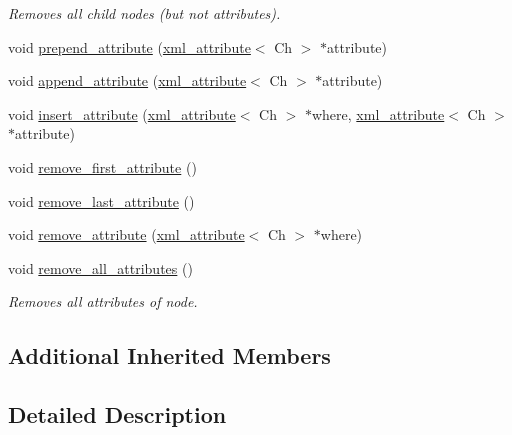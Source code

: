 \begin{DoxyCompactItemize}
\begin{DoxyCompactList}\small\item\em Removes all child nodes (but not attributes). \end{DoxyCompactList}\item 
void \hyperlink{classrapidxml_1_1xml__node_a8b62ee76489faf8e2d1210869d547684}{prepend\-\_\-attribute} (\hyperlink{classrapidxml_1_1xml__attribute}{xml\-\_\-attribute}$<$ Ch $>$ $\ast$attribute)
\item 
void \hyperlink{classrapidxml_1_1xml__node_a33ce3386f8c42dd4db658b75cbb6e6c4}{append\-\_\-attribute} (\hyperlink{classrapidxml_1_1xml__attribute}{xml\-\_\-attribute}$<$ Ch $>$ $\ast$attribute)
\item 
void \hyperlink{classrapidxml_1_1xml__node_a9fe659cdf4a5b3bbf5e8ffc98db5a84f}{insert\-\_\-attribute} (\hyperlink{classrapidxml_1_1xml__attribute}{xml\-\_\-attribute}$<$ Ch $>$ $\ast$where, \hyperlink{classrapidxml_1_1xml__attribute}{xml\-\_\-attribute}$<$ Ch $>$ $\ast$attribute)
\item 
void \hyperlink{classrapidxml_1_1xml__node_aa95192d2a165cca16c551ed2a2a06aec}{remove\-\_\-first\-\_\-attribute} ()
\item 
void \hyperlink{classrapidxml_1_1xml__node_a1781a2cbedc9a51d609ad5b528125635}{remove\-\_\-last\-\_\-attribute} ()
\item 
void \hyperlink{classrapidxml_1_1xml__node_a6f97b1b4f46a94a4587915df3c0c6b57}{remove\-\_\-attribute} (\hyperlink{classrapidxml_1_1xml__attribute}{xml\-\_\-attribute}$<$ Ch $>$ $\ast$where)
\item 
\hypertarget{classrapidxml_1_1xml__node_aa8d5d9484aa1eb5ff1841a073c84c1aa}{void \hyperlink{classrapidxml_1_1xml__node_aa8d5d9484aa1eb5ff1841a073c84c1aa}{remove\-\_\-all\-\_\-attributes} ()}\label{classrapidxml_1_1xml__node_aa8d5d9484aa1eb5ff1841a073c84c1aa}

\begin{DoxyCompactList}\small\item\em Removes all attributes of node. \end{DoxyCompactList}\end{DoxyCompactItemize}
\subsection*{Additional Inherited Members}


\subsection{Detailed Description}
